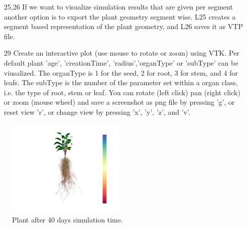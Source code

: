 \begin{itemize}
 \item[25,26] If we want to visualize simulation results that are given per segment another option is to export the plant geometry segment wise. L25 creates a segment based representation of the plant geometry, and L26 saves it as VTP file.
 \item[29] Create an interactive plot (use mouse to rotate or zoom) using VTK. Per default plant 'age', 'creationTime', 'radius','organType' or 'subType' can be viusalized. The organType is 1 for the seed, 2 for root, 3 for stem, and 4 for leafs. The subType is the number of the parameter set within a organ class, i.e. the type of root, stem or leaf. You can rotate (left click) pan (right click) or zoom (mouse wheel) and save a screenshot as png file by pressing 'g', or reset view 'r', or change view by pressing 'x', 'y', 'z', and 'v'.
 \end{itemize}
  
\begin{figure}
\centering
\includegraphics[width=0.5\textwidth]{examples/results/intro_basic.png} 
\caption{Plant after 40 days simulation time.} \label{fig:intro_basic}
\end{figure}  
